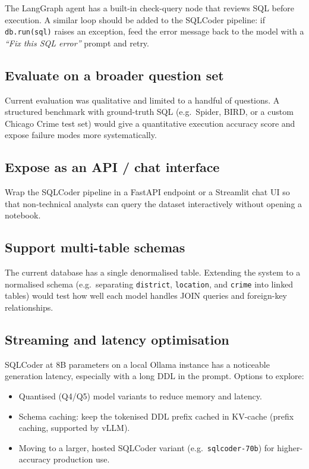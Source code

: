 \documentclass[12pt,a4paper]{article}
\begin{document}
The LangGraph agent has a built-in check-query node that reviews SQL before execution.
A similar loop should be added to the SQLCoder pipeline: if \texttt{db.run(sql)}
raises an exception, feed the error message back to the model with a
\textit{``Fix this SQL error''} prompt and retry.

\subsection{Evaluate on a broader question set}

Current evaluation was qualitative and limited to a handful of questions.  A
structured benchmark with ground-truth SQL (e.g.\ Spider, BIRD, or a custom
Chicago Crime test set) would give a quantitative execution accuracy score and
expose failure modes more systematically.

\subsection{Expose as an API / chat interface}

Wrap the SQLCoder pipeline in a FastAPI endpoint or a Streamlit chat UI so that
non-technical analysts can query the dataset interactively without opening a
notebook.

\subsection{Support multi-table schemas}

The current database has a single denormalised table.  Extending the system to a
normalised schema (e.g.\ separating \texttt{district}, \texttt{location}, and
\texttt{crime} into linked tables) would test how well each model handles JOIN
queries and foreign-key relationships.

\subsection{Streaming and latency optimisation}

SQLCoder at 8B parameters on a local Ollama instance has a noticeable generation
latency, especially with a long DDL in the prompt.  Options to explore:
\begin{itemize}[leftmargin=*, itemsep=2pt]
    \item Quantised (Q4/Q5) model variants to reduce memory and latency.
    \item Schema caching: keep the tokenised DDL prefix cached in KV-cache (prefix
          caching, supported by vLLM).
    \item Moving to a larger, hosted SQLCoder variant (e.g.\ \texttt{sqlcoder-70b})
          for higher-accuracy production use.
\end{itemize}
\end{document}
